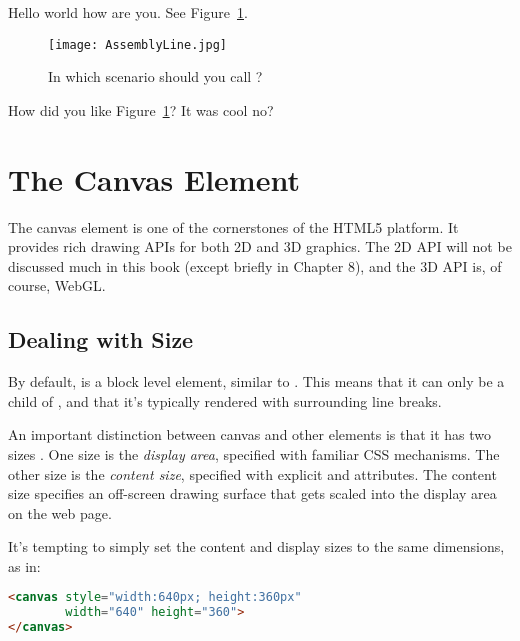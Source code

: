 Hello world how are you.  See Figure~\ref{fig:AssemblyLine}.

\begin{figure}[htb]\centering
  \texttt{[image: AssemblyLine.jpg]}
  \caption{In which scenario should you call ?}
  \label{fig:AssemblyLine}
\end{figure}

How did you like Figure~\ref{fig:AssemblyLine}?  It was cool no?

\section{The Canvas Element}

The canvas element  is one of the cornerstones of the HTML5 platform.  It provides rich drawing APIs for both 2D and 3D graphics.  The 2D API will not be discussed much in this book (except briefly in Chapter 8), and the 3D API is, of course, WebGL.

\subsection{Dealing with Size}

By default,  is a block level element, similar to .  This means that it can only be a child of , and that it's typically rendered with surrounding line breaks.

An important distinction between canvas and other elements is that it has two sizes .  One size is the \emph{display area}, specified with familiar  CSS mechanisms.  The other size is the \emph{content size}, specified with explicit   and   attributes.  The content size specifies an off-screen drawing surface that gets scaled into the display area on the web page.

It's tempting to simply set the content and display sizes to the same dimensions, as in:

\begin{lstlisting}[language=HTML]
<canvas style="width:640px; height:360px"
        width="640" height="360">
</canvas>
\end{lstlisting}

